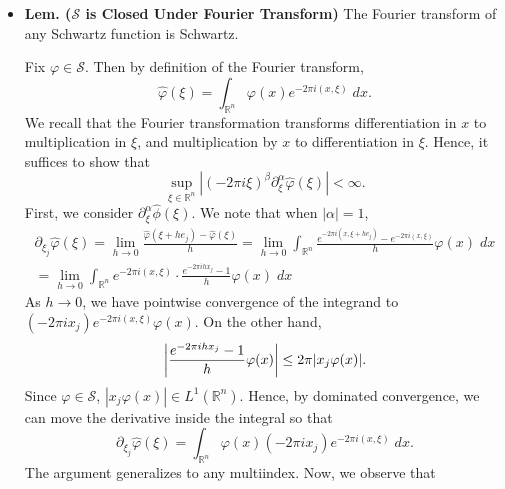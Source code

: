 \documentclass{article}
\begin{document}
\begin{itemize}
 	I.e., $\mathcal{S}$ is the space of all smooth functions such that every derivative decays faster than any polynomial. 
 	
 	\item \textbf{Lem. ($\mathcal{S}$ is Closed Under Fourier Transform)} The Fourier transform of any Schwartz function is Schwartz. 
 	
 		{\color{blue}
 			Fix $\varphi \in \mathcal{S}$. Then by definition of the Fourier transform, 
 				\begin{equation}
 					\hat{\varphi}(\xi) = \int_{\mathbb{R}^{n}}\varphi(x)e^{-2\pi i (x, \xi)}\;dx. 
 				\end{equation}	
 			We recall that the Fourier transformation transforms differentiation in $x$ to multiplication in $\xi$, and multiplication by $x$ to differentiation in $\xi$. Hence, it suffices to show that 
 				\begin{equation}
 					\sup_{\xi \in \mathbb{R}^{n}}|(-2\pi i \xi)^{\beta}\partial_{\xi}^{\alpha}\hat{\varphi}(\xi)| < \infty. 
 				\end{equation} 
 			First, we consider $\partial_{\xi}^{\alpha}\hat{\phi}(\xi)$. We note that when $|\alpha| = 1$, 
 			\begin{multline}
 				\partial_{\xi_{j}}\hat{\varphi}(\xi) = \lim_{h \to 0}\frac{\hat{\varphi}(\xi + he_{j}) - \hat{\varphi}(\xi)}{h} = \lim_{h \to 0}\int_{\mathbb{R}^{n}}\frac{e^{-2\pi i(x,\xi + he_{j})} - e^{-2\pi i(x, \xi)}}{h}\varphi(x)\;dx \\ = \lim_{h \to 0}\int_{\mathbb{R}^{n}}e^{-2\pi i (x, \xi)} \cdot \frac{e^{-2\pi i hx_{j}} - 1}{h}\varphi(x)\;dx 
 			\end{multline}
 		As $h \to 0$, we have pointwise convergence of the integrand to $(-2\pi i x_{j})e^{-2\pi i (x, \xi)}\varphi(x)$. On the other hand, 
 			\begin{equation}
 				\left| \frac{e^{-2\pi i hx_{j}} - 1}{h}\varphi(x) \right| \leq 2\pi |x_{j}\varphi(x)|. 
 			\end{equation}
 		Since $\varphi \in \mathcal{S}$, $|x_{j}\varphi(x)| \in L^{1}(\mathbb{R}^{n})$. Hence, by dominated convergence, we can move the derivative inside the integral so that 
 			\begin{equation}
 				\partial_{\xi_{j}}\hat{\varphi}(\xi) = \int_{\mathbb{R}^{n}}\varphi(x)(-2\pi i x_{j})e^{-2\pi i(x, \xi)}\;dx. 
 			\end{equation}
 		The argument generalizes to any multiindex. Now, we observe that 
  			\begin{align}
 				\begin{split}

\end{split}
\end{align}}
\end{itemize}
\end{document}
